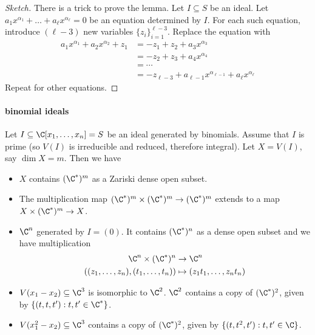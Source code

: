\documentclass[a4paper]{article}
\begin{document}
\begin{proof}[Sketch]
  There is a trick to prove the lemma. Let \(I \subseteq S\) be an ideal. Let \(a_1 x^{\alpha_1} + \dots + a_\ell x^{\alpha_\ell} = 0\) be an equation determined by \(I\). For each such equation, introduce \((\ell - 3)\) new variables \(\{z_i\}_{i = 1}^{\ell - 3}\). Replace the equation with
  \begin{align*}
    a_1 x^{\alpha_1} + a_2 x^{\alpha_2} + z_1
    &= -z_1 + z_2 + a_3 x^{\alpha_3} \\
    &= -z_2 + z_3 + a_4 x^{\alpha_4} \\
    &= \cdots \\
    &= -z_{\ell - 3} + a_{\ell - 1} x^{\alpha_{\ell - 1}} + a_\ell x^{\alpha_\ell}
  \end{align*}
  Repeat for other equations.
\end{proof}

\paragraph{binomial ideals}

Let \(I \subseteq \C[x_1, \dots, x_n] = S\) be an ideal generated by binomials. Assume that \(I\) is prime (so \(V(I)\) is irreducible and reduced, therefore integral). Let \(X = V(I)\), say \(\dim X = m\). Then we have
\begin{itemize}
\item \(X\) contains \((\C^*)^m\) as a Zariski dense open subset.
\item The multiplication map \((\C^*)^m \times (\C^*)^m \to (\C^*)^m\) extends to a map \(X \times (\C^*)^m \to X\).
\end{itemize}

\begin{eg}\leavevmode
  \begin{itemize}
  \item \(\C^n\) generated by \(I = (0)\). It contains \((\C^*)^n\) as a dense open subset and we have multiplication
    \begin{align*}
      \C^n \times (\C^*)^n &\to \C^n \\
      ((z_1, \dots, z_n), (t_1, \dots, t_n)) &\mapsto (z_1t_1, \dots, z_nt_n)
    \end{align*}
  \item \(V(x_1 - x_2) \subseteq \C^3\) is isomorphic to \(\C^2\). \(\C^2\) contains a copy of \((\C^*)^2\), given by \(\{(t, t, t'): t, t' \in \C^*\}\).
  \item \(V(x_1^2 - x_2) \subseteq \C^3\) contains a copy of \((\C^*)^2\), given by \(\{(t, t^2, t'): t, t' \in \C\}\).
  \end{itemize}
\end{eg}
\end{document}
